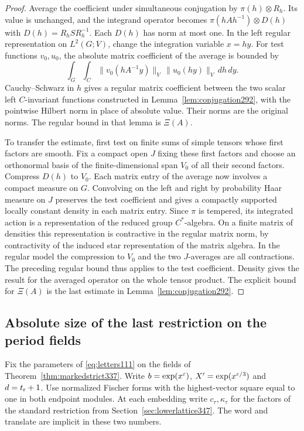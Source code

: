 \documentclass[a4paper,11pt]{article}
\theoremstyle{definition}
\theoremstyle{remark}
\numberwithin{equation}{section}
\begin{document}
\begin{proof}
Average the coefficient under simultaneous conjugation
by \(\pi(h)\otimes R_h\). Its value is unchanged, and
the integrand operator becomes
\(\pi(hAh^{-1})\otimes D(h)\) with
\(D(h)=R_h S R_h^{-1}\). Each \(D(h)\) has norm at most one.
In the left regular representation on \(L^2(G;V)\), change
the integration variable \(x=hy\). For test functions
\(v_0,u_0\), the absolute matrix coefficient of the
average is bounded by
\[
  \int_G\int_C
   \|v_0(hA^{-1}y)\|_V\,\|u_0(hy)\|_V\,dh\,dy .
\]
Cauchy--Schwarz in \(h\) gives a regular matrix coefficient
between the two scalar left \(C\)-invariant functions
constructed in Lemma~\ref{lem:conjugation292}, with the
pointwise Hilbert norm in place of absolute value. Their
norms are the original norms. The regular bound in that
lemma is \(\Xi(A)\).

To transfer the estimate, first test on finite sums of
simple tensors whose first factors are smooth. Fix a
compact open \(J\) fixing these first factors and choose
an orthonormal basis of the finite-dimensional span \(V_0\)
of all their second factors. Compress \(D(h)\) to \(V_0\).
Each matrix entry of the average now involves a compact
measure on \(G\). Convolving on the left and right by
probability Haar measure on \(J\) preserves the test
coefficient and gives a compactly supported locally
constant density in each matrix entry. Since \(\pi\) is
tempered, its integrated action is a representation of
the reduced group \(C^*\)-algebra. On a finite matrix of
densities this representation is contractive in the
regular matrix norm, by contractivity of the induced
star representation of the matrix algebra. In the
regular model the compression to \(V_0\) and the two
\(J\)-averages are all contractions. The preceding
regular bound thus applies to the test coefficient.
Density gives the result for the averaged operator on the
whole tensor product. The explicit bound for \(\Xi(A)\)
is the last estimate in Lemma~\ref{lem:conjugation292}.
\end{proof}

\subsection{Absolute size of the last restriction on the period fields}\label{sec:absolutelower349}

Fix the parameters of \eqref{eq:letters111} on the fields of
Theorem~\ref{thm:markedstrict337}. Write
\(b=\exp(x^\varepsilon)\), \(X'=\exp(x^{\varepsilon/3})\) and \(d=t_{\rm r}+1\).
Use normalized Fischer forms with the highest-vector square equal
to one in both endpoint modules. At each embedding write
\(c_\tau,\kappa_\tau\) for the factors of the standard restriction
from Section~\ref{sec:lowerlattice347}. The word and translate
are implicit in these two numbers.
\end{document}
